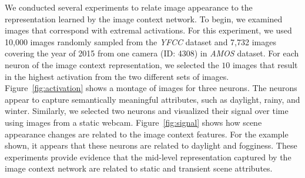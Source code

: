 \documentclass{bmvc2k}
\newcommand{\figref}[1]{Figure~\ref{fig:#1}}
\begin{document}
We conducted several experiments to relate image appearance to the
representation learned by the image context network.
%
To begin, we examined images that correspond with extremal
activations.  For this experiment, we used 10,000 images randomly
sampled from the {\em YFCC} dataset and 7,732 images covering the year of 2015 from 
one camera (ID: 4308) in {\em AMOS} dataset. For each neuron of 
the image context representation, we selected the $10$ images that result in 
the highest activation from the two different sets of images.  \figref{activation} 
shows a montage of images for three neurons.  The neurons appear to capture
semantically meaningful attributes, such as daylight, rainy, and winter. 
%
Similarly, we selected two neurons and visualized their signal over
time using images from a static webcam. \figref{signal} shows how
scene appearance changes are related to the image context features.
For the example shown, it appears that these neurons are related to
daylight and fogginess. 
%
These experiments provide evidence that the mid-level representation
captured by the image context network are related to static and
transient scene attributes.
\end{document}
